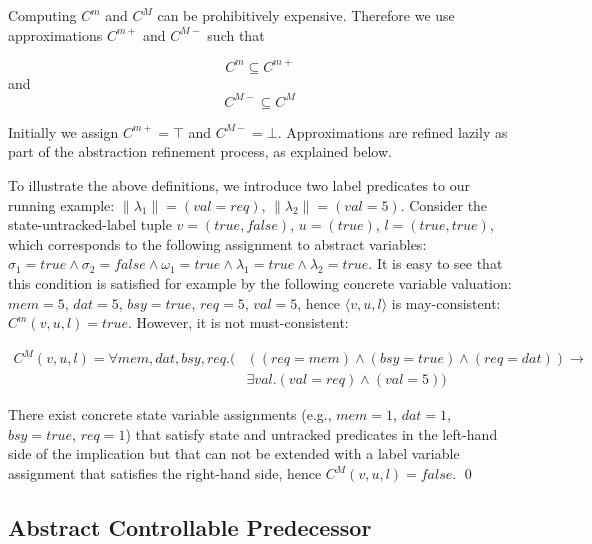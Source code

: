 Computing $C^m$ and $C^M$ can be prohibitively expensive.  Therefore we use approximations $C^{m+}$ and $C^{M-}$ such that 

\begin{equation}
    C^m\subseteq C^{m+}
\end{equation}
and 
\begin{equation}
    C^{M-}\subseteq C^M
\end{equation} 

Initially we assign $C^{m+}=\top$ and $C^{M-}=\bot$.  Approximations are refined lazily as part of the abstraction refinement process, as explained below.

\begin{ex}
    \everymath{\mathtt{\xdef\tmp{\fam\the\fam\relax}\aftergroup\tmp}}
    \everydisplay{\mathtt{\xdef\tmp{\fam\the\fam\relax}\aftergroup\tmp}}
    To illustrate the above definitions, we introduce two label predicates to our running example: $\|\lambda_1\|= (val=req)$, $\|\lambda_2\| = (val=5)$. Consider the state-untracked-label tuple $v=(true,false)$, $u=(true)$, $l=(true, true)$, which corresponds to the following assignment to abstract variables: $\sigma_1=true \land \sigma_2=false \land \omega_1=true \land \lambda_1=true \land\lambda_2=true$. It is easy to see that this condition is satisfied for example by the following concrete variable valuation: $mem=5$, $dat=5$, $bsy=true$, $req=5$, $val=5$, hence $\langle v,u,l\rangle$ is may-consistent: $C^m(v,u,l)=true$.  However, it is not must-consistent:

    $$
    \begin{aligned}
        C^M(v,u,l) = \forall  mem, dat, bsy,req. (&((req=mem) \land (bsy = true) \land (req=dat)) \rightarrow \\
                                                  &\exists val. (val=req) \land (val=5))
    \end{aligned}
    $$
    
    There exist concrete state variable assignments (e.g., $mem=1$, $dat=1$, $bsy=true$, $req=1$) that satisfy state and untracked predicates in the left-hand side of the implication but that can not be extended with a label variable assignment that satisfies the right-hand side, hence $C^M(v,u,l)=false$.  
    \qed
\end{ex}

\subsection{Abstract Controllable Predecessor}

